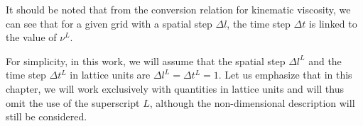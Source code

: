 It should be noted that from the conversion relation for kinematic viscosity, we can see that for a given grid with a spatial step \( \Delta l \), the time step \( \Delta t \) is linked to the value of \( \nu^L \).

For simplicity, in this work, we will assume that the spatial step \( \Delta l ^L \) and the time step \( \Delta t ^L \) in lattice units are \( \Delta l ^L  =  \Delta t ^L = 1 \). Let us emphasize that in this chapter, we will work exclusively with quantities in lattice units and will thus omit the use of the superscript \( L \), although the non-dimensional description will still be considered.